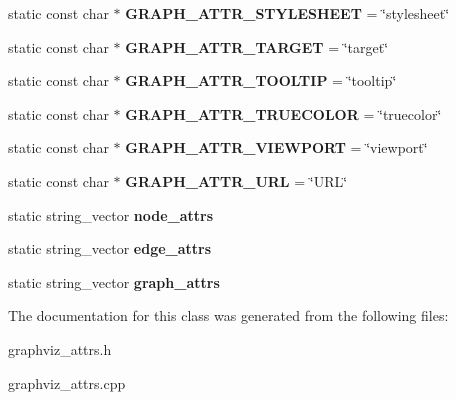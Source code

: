 \begin{DoxyCompactItemize}
\item 
static const char $\ast$ {\bfseries G\+R\+A\+P\+H\+\_\+\+A\+T\+T\+R\+\_\+\+S\+T\+Y\+L\+E\+S\+H\+E\+ET} = \char`\"{}stylesheet\char`\"{}\hypertarget{classmemgraph_1_1_graphviz_attrs_a8de56e821115d160d5be16fcb9105fbc}{}\label{classmemgraph_1_1_graphviz_attrs_a8de56e821115d160d5be16fcb9105fbc}

\item 
static const char $\ast$ {\bfseries G\+R\+A\+P\+H\+\_\+\+A\+T\+T\+R\+\_\+\+T\+A\+R\+G\+ET} = \char`\"{}target\char`\"{}\hypertarget{classmemgraph_1_1_graphviz_attrs_a3cf7b33d8d686c8b45d7be7a1b724af8}{}\label{classmemgraph_1_1_graphviz_attrs_a3cf7b33d8d686c8b45d7be7a1b724af8}

\item 
static const char $\ast$ {\bfseries G\+R\+A\+P\+H\+\_\+\+A\+T\+T\+R\+\_\+\+T\+O\+O\+L\+T\+IP} = \char`\"{}tooltip\char`\"{}\hypertarget{classmemgraph_1_1_graphviz_attrs_aa469879a033fe7c9a81b04a65426f120}{}\label{classmemgraph_1_1_graphviz_attrs_aa469879a033fe7c9a81b04a65426f120}

\item 
static const char $\ast$ {\bfseries G\+R\+A\+P\+H\+\_\+\+A\+T\+T\+R\+\_\+\+T\+R\+U\+E\+C\+O\+L\+OR} = \char`\"{}truecolor\char`\"{}\hypertarget{classmemgraph_1_1_graphviz_attrs_a22024b565ff08852bd5c042a49583781}{}\label{classmemgraph_1_1_graphviz_attrs_a22024b565ff08852bd5c042a49583781}

\item 
static const char $\ast$ {\bfseries G\+R\+A\+P\+H\+\_\+\+A\+T\+T\+R\+\_\+\+V\+I\+E\+W\+P\+O\+RT} = \char`\"{}viewport\char`\"{}\hypertarget{classmemgraph_1_1_graphviz_attrs_ad33d77a551f14d8c459f4955e9786bb8}{}\label{classmemgraph_1_1_graphviz_attrs_ad33d77a551f14d8c459f4955e9786bb8}

\item 
static const char $\ast$ {\bfseries G\+R\+A\+P\+H\+\_\+\+A\+T\+T\+R\+\_\+\+U\+RL} = \char`\"{}U\+RL\char`\"{}\hypertarget{classmemgraph_1_1_graphviz_attrs_a7347867c11f7ba21ef3df80ac7f31b7d}{}\label{classmemgraph_1_1_graphviz_attrs_a7347867c11f7ba21ef3df80ac7f31b7d}

\item 
static string\+\_\+vector {\bfseries node\+\_\+attrs}\hypertarget{classmemgraph_1_1_graphviz_attrs_a3582c4b5cee9eec0aa59dc365ba5bf84}{}\label{classmemgraph_1_1_graphviz_attrs_a3582c4b5cee9eec0aa59dc365ba5bf84}

\item 
static string\+\_\+vector {\bfseries edge\+\_\+attrs}\hypertarget{classmemgraph_1_1_graphviz_attrs_ae601bd81afe0bce990435e6015d94888}{}\label{classmemgraph_1_1_graphviz_attrs_ae601bd81afe0bce990435e6015d94888}

\item 
static string\+\_\+vector {\bfseries graph\+\_\+attrs}\hypertarget{classmemgraph_1_1_graphviz_attrs_af231cc97526b0cafb3450de2f9aa9c0a}{}\label{classmemgraph_1_1_graphviz_attrs_af231cc97526b0cafb3450de2f9aa9c0a}

\end{DoxyCompactItemize}


The documentation for this class was generated from the following files\+:\begin{DoxyCompactItemize}
\item 
graphviz\+\_\+attrs.\+h\item 
graphviz\+\_\+attrs.\+cpp\end{DoxyCompactItemize}
